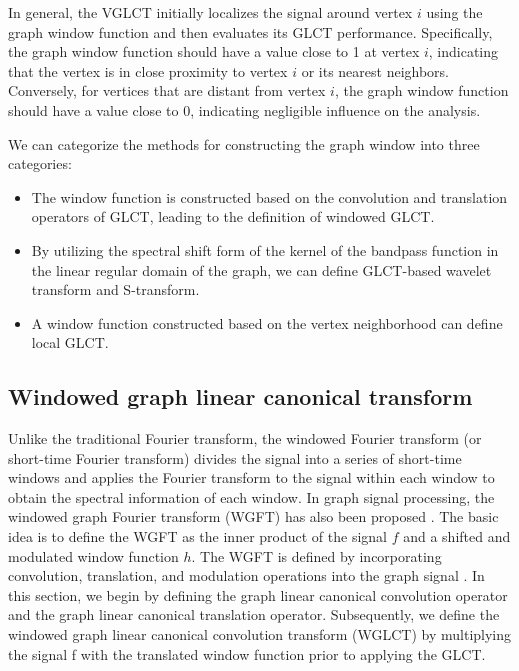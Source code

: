 \documentclass[lettersize,journal]{IEEEtran}
\begin{document}
In general, the VGLCT initially localizes the signal around vertex $i$ using the graph window function and then evaluates its GLCT performance. Specifically, the graph window function should have a value close to 1 at vertex $i$, indicating that the vertex is in close proximity to vertex $i$ or its nearest neighbors. Conversely, for vertices that are distant from vertex $i$, the graph window function should have a value close to 0, indicating negligible influence on the analysis.

We can categorize the methods for constructing the graph window into three categories:
\begin{itemize}
\item The window function is constructed based on the convolution and translation operators of GLCT, leading to the definition of windowed GLCT.
\item By utilizing the spectral shift form of the kernel of the bandpass function in the linear regular domain of the graph, we can define GLCT-based wavelet transform and S-transform.
\item A window function constructed based on the vertex neighborhood can define local GLCT.
\end{itemize}




\subsection{Windowed graph linear canonical transform} \label{sec3.1}
Unlike the traditional Fourier transform, the windowed Fourier transform (or short-time Fourier transform) divides the signal into a series of short-time windows and applies the Fourier transform to the signal within each window to obtain the spectral information of each window. In graph signal processing, the windowed graph Fourier transform (WGFT) has also been proposed \cite{shuman2012windowed, shuman2016vertex}. The basic idea is to define the WGFT as the inner product of the signal $f$ and a shifted and modulated window function $h$. The WGFT is defined by incorporating convolution, translation, and modulation operations into the graph signal \cite{yan2021windowed}. In this section, we begin by defining the graph linear canonical convolution operator and the graph linear canonical translation operator. Subsequently, we define the windowed graph linear canonical convolution transform (WGLCT) by multiplying the signal f with the translated window function prior to applying the GLCT.
\end{document}
